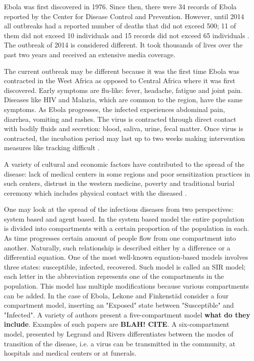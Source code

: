 \documentclass[10pt]{article}
\begin{document}
Ebola was first discovered in 1976. Since then, there were 34 records of Ebola reported by the Center for Disease Control and Prevention. However, until 2014 all outbreaks had a reported number of deaths that did not exceed 500; 11 of them did not exceed 10 individuals and 15 records did not exceed 65 individuals \cite{CDCOutbreaks}.  The outbreak of 2014 is considered different. It took thousands of lives over the past two years and received an extensive media coverage.

The current outbreak may be different because it was the first time Ebola was contracted in the West Africa as opposed to Central Africa where it was first discovered. Early symptoms are flu-like: fever, headache, fatigue and joint pain. Diseases like HIV and Malaria, which are common to the region, have the same symptoms. As Ebola progresses, the infected experiences abdominal pain, diarrhea, vomiting and rashes. The virus is contracted through direct contact with bodily fluids and secretion: blood, saliva, urine, fecal matter. Once virus is contracted, the incubation period may last up to two weeks making intervention measures like tracking difficult \cite{CDCSympt}. 

A variety of cultural and economic factors have contributed to the spread of the disease: lack of medical centers in some regions and poor sensitization practices in such centers, distrust in the western medicine, poverty and traditional burial ceremony which includes physical contact with the diseased \cite{WHOReasons}. 

One may look at the spread of the infectious diseases from two perspectives: system based and agent based. In the system based model the entire population is divided into compartments with a certain proportion of the population in each. As time progresses certain amount of people flow from one compartment into another. Naturally, such relationship is described either by a difference or a differential equation. One of the most well-known equation-based models involves three states: susceptible, infected, recovered. Such model is called an SIR model; each letter in the abbreviation represents one of the compartments in the population. This model has multiple modifications because various compartments can be added. In the case of Ebola, Lekone and Finkenstäd \cite{Lekone2006} consider a four compartment model, inserting an "Exposed" state between "Susceptible" and "Infected". A variety of authors present a five-compartment model \textbf{what do they include}. Examples of such papers are \textbf{BLAH! CITE}. A six-compartment model, presented by Legrand \cite{Legrand2007} and Rivers\cite{Rivers2014} differentiates between the modes of transition of the disease, i.e. a virus can be transmitted in the community, at hospitals and medical centers or at funerals.
\end{document}
